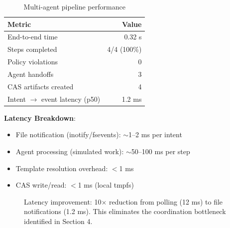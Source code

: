 \documentclass[11pt]{article}
\begin{document}
\begin{table}[h]
\centering
\begin{tabular}{lr}
\toprule
\textbf{Metric} & \textbf{Value} \\
\midrule
End-to-end time & 0.32 s \\
Steps completed & 4/4 (100\%) \\
Policy violations & 0 \\
Agent handoffs & 3 \\
CAS artifacts created & 4 \\
Intent $\to$ event latency (p50) & 1.2 ms \\
\bottomrule
\end{tabular}
\caption{Multi-agent pipeline performance}
\label{tab:multiagent}
\end{table}

\textbf{Latency Breakdown}:
\begin{itemize}
\item File notification (inotify/fsevents): $\sim$1--2 ms per intent
\item Agent processing (simulated work): $\sim$50--100 ms per step
\item Template resolution overhead: $<$1 ms
\item CAS write/read: $<$1 ms (local tmpfs)
\end{itemize}

\begin{figure}[h]
\centering
{}
\caption{Latency improvement: 10$\times$ reduction from polling (12 ms) to file notifications (1.2 ms). This eliminates the coordination bottleneck identified in Section 4.}
\label{fig:latency-comparison}
\end{figure}
\end{document}
